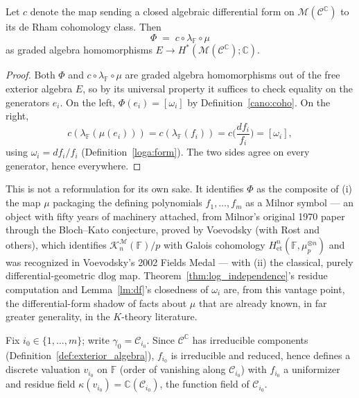 \documentclass[article,11pt]{amsart} \numberwithin{equation}{section}
\numberwithin{equation}{section}
\begin{document}
{\begin{thm}
	\label{thm:A}
	Let $c$ denote the map sending a closed algebraic differential form on
	$\mathcal M(\mathcal C^\mathbb C)$ to its de Rham cohomology class. Then
	\[
	\Phi \;=\; c\circ\lambda_\mathbb F\circ\mu
	\]
	as graded algebra homomorphisms $E\longrightarrow H^*(\mathcal M(\mathcal C^\mathbb C);\mathbb C)$.
\end{thm}

\begin{proof}
	Both $\Phi$ and $c\circ\lambda_\mathbb F\circ\mu$ are graded algebra homomorphisms
	out of the free exterior algebra $E$, so by its universal property it
	suffices to check equality on the generators $e_i$. On the left,
	$\Phi(e_i)=[\omega_i]$ by Definition~\ref{cano:coho}. On the right,
	\[
	c(\lambda_\mathbb F(\mu(e_i))) = c(\lambda_\mathbb F(f_i)) = c\Big(\frac{df_i}{f_i}\Big) = [\omega_i],
	\]
	using $\omega_i=df_i/f_i$ (Definition~\ref{loga:form}). The two sides agree on every
	generator, hence everywhere.
\end{proof}

\begin{rk}
	This is not a reformulation for its own sake. It identifies $\Phi$ as the
	composite of (i) the map $\mu$ packaging the defining polynomials
	$f_1,\dots,f_m$ as a Milnor symbol --- an object with fifty years of
	machinery attached, from Milnor's original 1970 paper through the
	Bloch--Kato conjecture, proved by Voevodsky (with Rost and others), which
	identifies $\mathcal K^\mathcal M_n(\mathbb F)/p$ with Galois cohomology $H^n_{\mathrm{et}}(\mathbb F,\mu_p^{\otimes n})$
	and was recognized in Voevodsky's 2002 Fields Medal --- with (ii) the
	classical, purely differential-geometric $\mathrm{dlog}$ map. Theorem~\ref{thm:log_independence}'s
	residue computation and Lemma~\ref{lm:df}'s closedness of $\omega_i$ are, from this
	vantage point, the differential-form shadow of facts about $\mu$ that are
	already known, in far greater generality, in the $K$-theory literature.
\end{rk}

Fix $i_0\in\{1,\dots,m\}$; write $\gamma_0=\mathscr C_{i_0}$. Since $\mathcal C^\mathbb C$
has irreducible components (Definition~\ref{def:exterior_algebra}), $f_{i_0}$ is irreducible and
reduced, hence defines a discrete valuation $v_{i_0}$ on $\mathbb F$ (order of
vanishing along $\mathscr C_{i_0}$) with $f_{i_0}$ a uniformizer and residue field
$\kappa(v_{i_0})=\mathbb C(\mathscr C_{i_0})$, the function field of $\mathscr C_{i_0}$.

}
\end{document}
